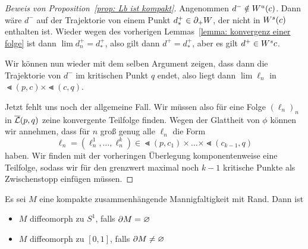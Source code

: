 \begin{proof}[Beweis von Proposition~\ref{prop: Lb ist kompakt}]
    Angenommen $d^- \notin { W^u } (c)$. Dann wäre $d^-$ auf der Trajektorie von einem Punkt
    $d^+_{\ast} \in { \partial }_+ W$, der nicht in ${ W^s } (c)$ enthalten ist. Wieder wegen des vorherigen
    Lemmas~\ref{lemma: konvergenz einer folge} ist dann $\lim d_n^+ = d^+_{\ast}$, also gilt dann
    $d^+ = d^+_{\ast}$, aber es gilt $d^+ \in { W^s }{c}$.
    
    Wir können nun wieder mit dem selben Argument zeigen, dass dann die Trajektorie von $d^-$ im
    kritischen Punkt $q$ endet, also liegt dann $\lim \ell_n$ in $\Lt (p, c) \times \Lt (c, q)$.

    Jetzt fehlt uns noch der allgemeine Fall. Wir müssen also für eine Folge $(\ell_n)_n$ in 
    ${\overline{\mathcal{L}} } (p, q)$ zeine konvergente Teilfolge finden. Wegen der Glattheit von $\phi$ können wir annehmen,
    dass für $n$ groß genug alle $\ell_n$ die Form 
    \[ \ell_n = (\ell^1_n, \dots, \ell^k_n) \in \Lt (p, c_1) \times \dots \times \Lt (c_{k - 1}, q) \]
    haben. Wir finden mit der vorheringen Überlegung komponentenweise eine Teilfolge, sodass wir 
    für den grenzwert maximal noch $k - 1$ kritische Punkte als \glqq Zwischenstopp\grqq{} einfügen
    müssen. 
\end{proof}

\begin{theorem}
    Es sei $M$ eine kompakte zusammenhängende Mannigfaltigkeit mit Rand. Dann ist
    \begin{itemize}
        \item $M$ diffeomorph zu $S^1$, falls ${ \partial } M = \varnothing$
        \item $M$ diffeomorph zu $[0, 1]$, falls ${ \partial } M \neq \varnothing$
    \end{itemize}
\end{theorem}

